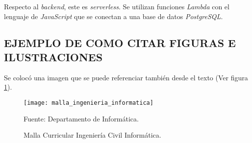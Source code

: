 Respecto al \textit{backend}, este es \textit{serverless}. Se utilizan funciones \textit{Lambda} con el lenguaje de \textit{JavaScript} que se conectan a una base de datos \textit{PostgreSQL}.



\subsection{EJEMPLO DE COMO CITAR FIGURAS E ILUSTRACIONES}

Se colocó una imagen que se puede referenciar también desde el texto (Ver figura \ref{fig:malla}).

\begin{figure}[h]
\centering
\texttt{[image: malla\_ingenieria\_informatica]}
\caption{\label{fig:malla} Malla Curricular Ingeniería Civil Informática.} Fuente: Departamento de Informática.
\end{figure}

